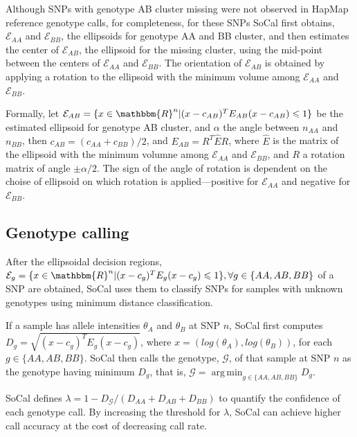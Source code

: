\documentclass{scrartcl}
\begin{document}
Although SNPs with genotype AB cluster missing were not observed in HapMap
reference genotype calls, for completeness, for these SNPs SoCal first
obtains, $\mathcal{E}_{AA}$ and $\mathcal{E}_{BB}$,
the ellipsoids for genotype AA and BB cluster, and then estimates the
center of $\mathcal{E}_{AB}$, the ellipsoid for the missing cluster, using
the mid-point between the centers of $\mathcal{E}_{AA}$ and $\mathcal{E}_{BB}$.
The orientation of $\mathcal{E}_{AB}$ is obtained by applying a rotation
to the ellipsoid with the minimum volume among $\mathcal{E}_{AA}$ and
$\mathcal{E}_{BB}$.

\par
Formally, let $\mathcal{E}_{AB}=
\{x \in \mathbbm{R}^{n}|(x-c_{AB})^TE_{AB}(x-c_{AB}) \leqslant 1\}$ be the
estimated ellipsoid for genotype AB cluster, and $\alpha$ the angle between
$n_{AA}$ and $n_{BB}$, then
$c_{AB}=(c_{AA}+c_{BB})/2$, and
$E_{AB}=R^{T}\hat{E}R$, where $\hat{E}$ is the matrix of the ellipsoid
with the minimum volumne among $\mathcal{E}_{AA}$ and $\mathcal{E}_{BB}$, and
$R$ a rotation matrix of angle $\pm\alpha/2$.
The sign of the angle of rotation is dependent on the choise of ellipsoid on
which rotation is applied---positive for $\mathcal{E}_{AA}$ and negative
for $\mathcal{E}_{BB}$.

\subsection{Genotype calling}

\par
After the ellipsoidal decision regions,
$\mathcal{E}_{g}=
\{x \in \mathbbm{R}^{n} | (x-c_g)^TE_g(x-c_g) \leqslant 1\},
\forall g\in\{AA,AB,BB\}$ of a SNP are obtained, SoCal uses them to classify
SNPs for samples with unknown genotypes using minimum distance classification.

\par
If a sample has allele intensities $\theta_A$ and $\theta_B$ at SNP $n$,
SoCal first computes
$D_g=\sqrt{(x-c_g)^TE_g(x-c_g)}$,
where $x=(log(\theta_A), log(\theta_B))$, for each $g\in\{AA,AB,BB\}$.
SoCal then calls the genotype, $\mathcal{G}$, of that sample at SNP $n$
as the genotype having minimum $D_g$, that is,
$\mathcal{G}=\operatorname*{arg\,min}_{g\in \{AA,AB,BB\}}D_g$.

\par
SoCal defines $\lambda=1-D_{\mathcal{G}}/(D_{AA}+D_{AB}+D_{BB})$ to quantify
the confidence of each genotype call.
By increasing the threshold for $\lambda$, SoCal can achieve higher call
accuracy at the cost of decreasing call rate.
\end{document}
